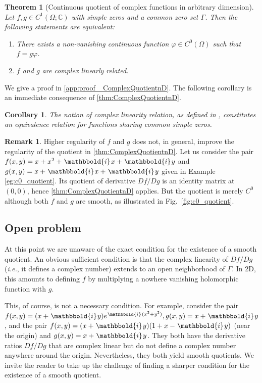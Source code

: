 \documentclass{article}
\theoremstyle{theorem}
\newtheorem{theorem}{Theorem}
\newtheorem{corollary}{Corollary}
\theoremstyle{definition}
\newtheorem{remark}{Remark}
\newcommand{\figref}[1]{\textup{Fig.~\ref{#1}}}
\def\ie{\emph{i.e.}}
\def\CC{\mathbb{C}}
\newcommand{\ii}{\mkern1.5mu\mathbbold{i}\mkern1.5mu}
\begin{document}
\begin{theorem}[Continuous quotient of complex functions in arbitrary dimension]\label{thm:ComplexQuotientnD}
    Let \(f,g\in C^1(\Omega;\CC)\) with simple zeros and a common zero set \(\Gamma\).  Then the following statements are equivalent:
    \begin{enumerate}[leftmargin=*,label=(\roman*)]
        \item 
        There exists a non-vanishing continuous function \(\varphi\in C^0(\Omega)\) such that \(f = g\varphi\).       
        \item \(f\) and \(g\) are complex linearly related.
    \end{enumerate}
\end{theorem}
We give a proof in \autoref{app:proof_ ComplexQuotientnD}. The following corollary is an immediate consequence of \autoref{thm:ComplexQuotientnD}.

\begin{corollary}\label{cor:ComplexLinearEquivalenceRelation}
    The notion of complex linearity relation, as defined in , constitutes an equivalence relation for functions sharing common simple zeros.
\end{corollary}
\begin{remark}
    Higher regularity of $f$ and $g$ does not, in general, improve the regularity of the quotient in \autoref{thm:ComplexQuotientnD}. Let us consider the pair $f(x,y)=x+x^2+\ii x+\ii y$ and $g(x,y)=x+\ii x + \ii y$ given in Example \ref{eg:c0_quotient}. Its quotient of derivative $Df/Dg$ is an identity matrix at $(0,0)$, hence \autoref{thm:ComplexQuotientnD} applies. But the quotient is merely $C^0$ although both $f$ and $g$ are smooth, as illustrated in \figref{fig:c0_quotient}.
\end{remark}


\subsection{Open problem}
At this point we are unaware of the exact condition for the existence of a smooth quotient. An obvious sufficient condition is that the complex linearity of $Df/Dg$ (\ie, it defines a complex number) extends to an open neighborhood of $\Gamma$. In 2D, this amounts to defining $f$ by multiplying a nowhere vanishing holomorphic function with $g$.

This, of course, is not a necessary condition. For example, consider the pair $f(x,y)=(x+\ii y)e^{\ii(x^2+y^2)},g(x,y)=x+\ii y$, and the pair $f(x,y)=(x+\ii y)(1+x-\ii y)$ (near the origin) and $g(x,y)=x+\ii y$. They both have the  derivative ratios $Df/Dg$ that are complex linear  but do not define a complex number anywhere around the origin. Nevertheless, they both yield smooth quotients. 
We invite the reader to take up the challenge of finding a sharper condition for the existence of a smooth quotient.
\end{document}
